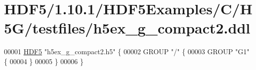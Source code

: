 \hypertarget{_h_d_f5_21_810_81_2_h_d_f5_examples_2_c_2_h5_g_2testfiles_2h5ex__g__compact2_8ddl_source}{}\section{H\+D\+F5/1.10.1/\+H\+D\+F5\+Examples/\+C/\+H5\+G/testfiles/h5ex\+\_\+g\+\_\+compact2.ddl}
\label{_h_d_f5_21_810_81_2_h_d_f5_examples_2_c_2_h5_g_2testfiles_2h5ex__g__compact2_8ddl_source}

\begin{DoxyCode}
00001 \hyperlink{namespace_h_d_f5}{HDF5} \textcolor{stringliteral}{"h5ex\_g\_compact2.h5"} \{
00002 GROUP \textcolor{stringliteral}{"/"} \{
00003    GROUP \textcolor{stringliteral}{"G1"} \{
00004    \}
00005 \}
00006 \}
\end{DoxyCode}
